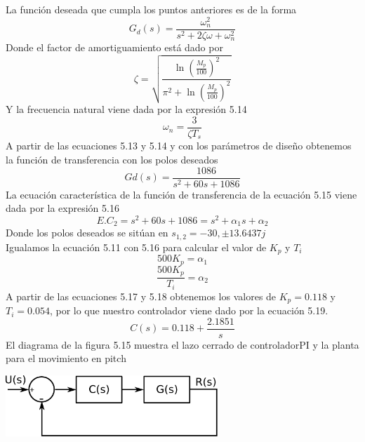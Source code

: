 La función deseada que cumpla los puntos anteriores es de la forma 
\begin{equation}
	G_d(s) = \frac{\omega_n^2}{s^2 + 2\zeta\omega + \omega_n^2}
\end{equation}
Donde el factor de amortiguamiento está dado por
\begin{equation}
	\zeta = \sqrt{\frac{\ln\left(\frac{M_p}{100}\right)^2}{\pi^2 + \ln\left(\frac{M_p}{100}\right)^2}}
\end{equation}
Y la frecuencia natural viene dada por la expresión 5.14
\begin{equation}
	\omega_n = \frac{3}{\zeta T_s}
\end{equation}
A partir de las ecuaciones 5.13 y 5.14 y con los parámetros de diseño obtenemos la función de transferencia con los polos deseados 
\begin{equation}
	Gd(s) = \frac{1086}{s^2 + 60s + 1086}
\end{equation}
La ecuación característica de la función de transferencia de la ecuación 5.15 viene dada por la
expresión 5.16
\begin{equation}
	E.C_2 = s^2 + 60s + 1086 = s^2 + \alpha_1s + \alpha_2
\end{equation}
Donde los polos deseados se sitúan en $s_{1,2} = -30, \pm 13.6437j$ \\
Igualamos la ecuación 5.11 con 5.16 para calcular el valor de $K_p$ y $T_i$
\begin{equation}
	500K_p = \alpha_1
\end{equation}
\begin{equation}
	\frac{500K_p}{T_i} = \alpha_2
\end{equation}
A partir de las ecuaciones 5.17 y 5.18 obtenemos los valores de $K_p = 0.118$ y $T_i = 0.054$, por lo que nuestro controlador viene dado por la ecuación 5.19.
\begin{equation}
	C(s) = 0.118 + \frac{2.1851}{s}
\end{equation}
El diagrama de la figura 5.15 muestra el lazo cerrado de controladorPI y la planta para el movimiento en pitch
\begin{center}
	\includegraphics[width=0.6\textwidth]{Contenido/Cuerpo/Capitulo5/Fig37.eps}
	\label{Fig4}
\end{center}
